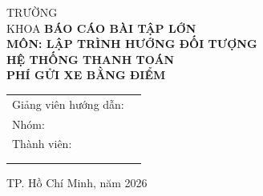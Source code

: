 \begin{titlepage}
\centering
{\large TRƯỜNG \underline{\hspace{5cm}}\\[0.3cm]
KHOA \underline{\hspace{5cm}}}\vfill
{\Large\bfseries BÁO CÁO BÀI TẬP LỚN\\[0.5cm]
MÔN: LẬP TRÌNH HƯỚNG ĐỐI TƯỢNG}\\[1cm]
{\huge\bfseries HỆ THỐNG THANH TOÁN\\ PHÍ GỬI XE BẰNG ĐIỂM}\vfill
\begin{flushright}\begin{tabular}{ll}
Giảng viên hướng dẫn: & \underline{\hspace{5cm}}\\
Nhóm: & \underline{\hspace{5cm}}\\
Thành viên: & \underline{\hspace{5cm}}\\
& \underline{\hspace{5cm}}\\
& \underline{\hspace{5cm}}
\end{tabular}\end{flushright}\vfill
TP. Hồ Chí Minh, năm 2026
\end{titlepage}
